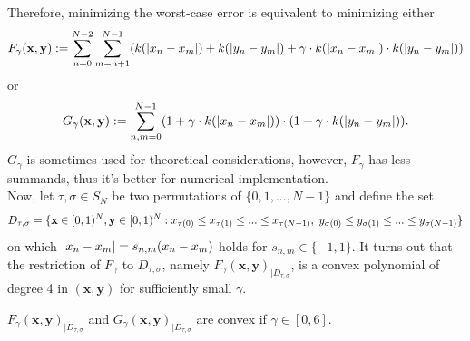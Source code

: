 \vspace{2mm}
Therefore, minimizing the worst-case error is equivalent to minimizing either
\begin{equation*}
    F_{\gamma}(\textbf{x},\textbf{y}) := \sum_{n=0}^{N-2} \sum_{m=n+1}^{N-1} (k(\lvert x_n-x_m\rvert) +  k(\lvert y_n-y_m\rvert) + \gamma \cdot k(\lvert x_n-x_m\rvert)\cdot k(\lvert y_n-y_m\rvert))
\end{equation*}
or
\begin{equation*}
    G_{\gamma}(\textbf{x},\textbf{y}) := \sum_{n,m=0}^{N-1} (1 + \gamma \cdot k(\lvert x_n-x_m\rvert)) \cdot (1 + \gamma \cdot k(\lvert y_n-y_m\rvert)).
\end{equation*}
$G_{\gamma}$ is sometimes used for theoretical considerations, however, $F_{\gamma}$ has less summands, thus it's better for numerical implementation.\\

Now, let $\tau,\sigma \in S_N$ be two permutations of $\{ 0,1,...,N-1 \}$ and define the set
\begin{equation*}
    D_{\tau,\sigma} = \{ \textbf{x}\in [0,1)^N, \textbf{y}\in [0,1)^N : x_{\tau (0)} \leq x_{\tau (1)} \leq ... \leq x_{\tau (N-1)}, \hspace{1mm} y_{\sigma (0)} \leq y_{\sigma (1)} \leq ... \leq y_{\sigma (N-1)} \}
\end{equation*}
on which $\lvert x_n - x_m\rvert = s_{n,m}(x_n-x_m)$ holds for $s_{n,m} \in \{ -1,1\}$. It turns out that the restriction of $F_{\gamma}$ to $D_{\tau,\sigma}$, namely $F_{\gamma}(\textbf{x},\textbf{y})_{\mid D_{\tau,\sigma}}$, is a convex polynomial of degree 4 in $(\textbf{x},\textbf{y})$ for sufficiently small $\gamma$.\\

\begin{Prop}
    $F_{\gamma}(\textbf{x},\textbf{y})_{\mid D_{\tau,\sigma}}$ and $G_{\gamma}(\textbf{x},\textbf{y})_{\mid D_{\tau,\sigma}}$ are convex if $\gamma \in [0,6]$.
\end{Prop}

